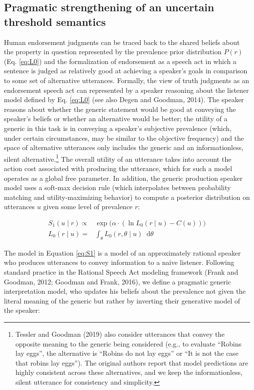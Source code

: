 \documentclass[floatsintext,doc]{apa6}
\let\rmarkdownfootnote\footnote%
\def\footnote{\protect\rmarkdownfootnote}
\newcommand*\diff{\mathop{}\!\mathrm{d}}
\begin{document}
\subsection{Pragmatic strengthening of an uncertain threshold semantics}

Human endorsement judgments can be traced back to the shared beliefs about the property in question represented by the prevalence prior distribution $P(r)$ (Eq. \ref{eq:L0}) and the formalization of endorsement as a speech act in which a sentence is judged as relatively good at achieving a speaker's goals in comparison to some set of alternative utterances. 
Formally, the view of truth judgments as an endorsement speech act can represented by a speaker reasoning about the listener model defined by Eq. \ref{eq:L0} (see also Degen and Goodman, 2014).
The speaker reasons about whether the generic statement would be good at conveying the speaker's beliefs or whether an alternative would be better; the utility of a generic in this task is in conveying a speaker's subjective prevalence (which, under certain circumstances, may be similar to the objective frequency) and the space of alternative utterances only includes the generic and an informationless, silent alternative.\footnote{
Tessler and Goodman (2019) also consider utterances that convey the opposite meaning to the generic being considered (e.g., to evaluate ``Robins lay eggs'', the alternative is ``Robins do not lay eggs'' or ``It is not the case that robins lay eggs''). The original authors report that model predictions are highly consistent across these alternatives, and we keep the informationless, silent utterance for consistency and simplicity. 
}
The overall utility of an utterance takes into account the action cost associated with producing the utterance, which for such a model operates as a global free parameter.
In addition, the generic production speaker model uses a soft-max decision rule (which interpolates between probability matching and utility-maximizing behavior) to compute a posterior distribution on utterances $u$ given some level of prevalence $r$:

\begin{align}
S_1(u \mid r) \propto &\exp{(\alpha \cdot ( \ln L_0(r \mid u) - C(u))}) \label{eq:S1} \\
L_0(r \mid u) = &\int_\theta L_0(r, \theta \mid u) \diff\theta
\end{align}

The model in Equation \ref{eq:S1} is a model of an approximately rational speaker who produces utterances to convey information to a naive listener. 
Following standard practice in the Rational Speech Act modeling framework (Frank and Goodman, 2012; Goodman and Frank, 2016), we define a pragmatic generic interpretation model, who updates his beliefs about the prevalence not given the literal meaning of the generic but rather by inverting their generative model of the speaker:
\end{document}
